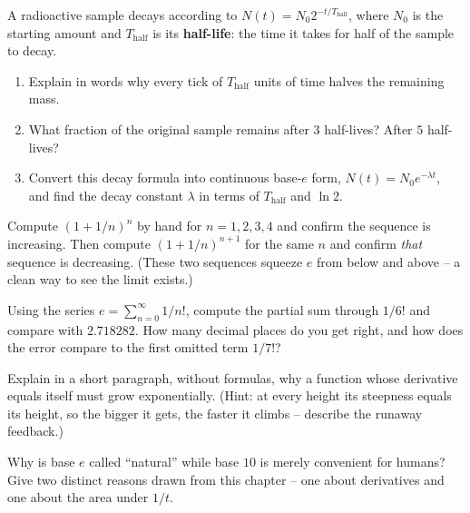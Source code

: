 \begin{exercise}
\label{ch03:exc-doubling-half}
A radioactive sample decays according to $N(t) = N_0 2^{-t/T_{\text{half}}}$, where $N_0$ is the starting amount and $T_{\text{half}}$ is its \textbf{half-life}: the time it takes for half of the sample to decay.
\begin{enumerate}[label=(\alph*)]
  \item Explain in words why every tick of $T_{\text{half}}$ units of time halves the remaining mass.
  \item What fraction of the original sample remains after $3$ half-lives? After $5$ half-lives?
  \item Convert this decay formula into continuous base-$e$ form, $N(t) = N_0 e^{-\lambda t}$, and find the decay constant $\lambda$ in terms of $T_{\text{half}}$ and $\ln 2$.
\end{enumerate}
\end{exercise}

\begin{exercise}
\label{ch03:exc-compound-bounds}
Compute $(1+1/n)^n$ by hand for $n=1,2,3,4$ and confirm the sequence is increasing. Then compute $(1+1/n)^{n+1}$ for the same $n$ and confirm \emph{that} sequence is decreasing. (These two sequences squeeze $e$ from below and above -- a clean way to see the limit exists.)
\end{exercise}

\begin{exercise}
\label{ch03:exc-series-error}
Using the series $e=\sum_{n=0}^{\infty}1/n!$, compute the partial sum through $1/6!$ and compare with $2.718282$. How many decimal places do you get right, and how does the error compare to the first omitted term $1/7!$?
\end{exercise}

\begin{exercise}
\label{ch03:exc-conc-slope}
Explain in a short paragraph, without formulas, why a function whose derivative equals itself must grow exponentially. (Hint: at every height its steepness equals its height, so the bigger it gets, the faster it climbs -- describe the runaway feedback.)
\end{exercise}

\begin{exercise}
\label{ch03:exc-conc-natural}
Why is base $e$ called ``natural'' while base $10$ is merely convenient for humans? Give two distinct reasons drawn from this chapter -- one about derivatives and one about the area under $1/t$.
\end{exercise}

